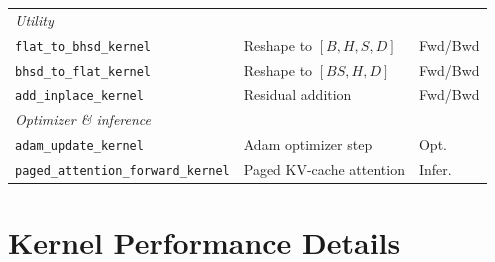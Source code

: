 \documentclass[11pt,letterpaper]{article}
\begin{document}
\begin{table}[h]
\begin{tabular}{lll}
\midrule
\multicolumn{3}{l}{\textit{Utility}} \\
\texttt{flat\_to\_bhsd\_kernel}           & Reshape to $[B,H,S,D]$    & Fwd/Bwd \\
\texttt{bhsd\_to\_flat\_kernel}           & Reshape to $[BS,H,D]$     & Fwd/Bwd \\
\texttt{add\_inplace\_kernel}             & Residual addition         & Fwd/Bwd \\
\midrule
\multicolumn{3}{l}{\textit{Optimizer \& inference}} \\
\texttt{adam\_update\_kernel}             & Adam optimizer step       & Opt. \\
\texttt{paged\_attention\_forward\_kernel}& Paged KV-cache attention  & Infer. \\
\bottomrule
\end{tabular}
\end{table}


\newpage
\section{Kernel Performance Details}\label{app:kernels}
\end{document}
